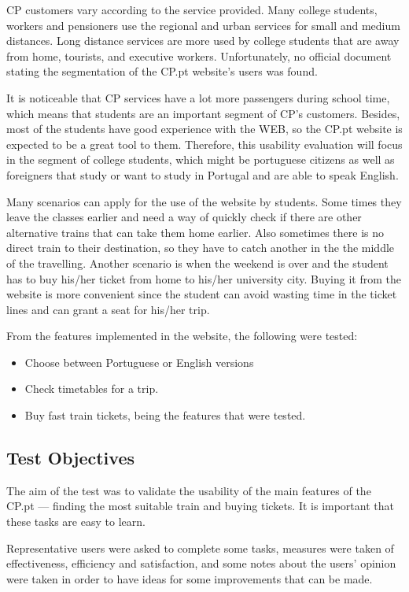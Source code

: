 \documentclass[a4paper]{article}
\begin{document}
CP customers vary according to the service provided. Many college students, workers and pensioners use the regional and urban services for small and medium distances. Long distance services are more used by college students that are away from home, tourists, and executive workers. Unfortunately, no official document stating the segmentation of the CP.pt website's users was found.

It is noticeable that CP services have a lot more passengers during school time, which means that students are an important segment of CP's customers. Besides, most of the students have good experience with the WEB, so the CP.pt website is expected to be a great tool to them. Therefore, this usability evaluation will focus in the segment of college students, which might be portuguese citizens as well as foreigners that study or want to study in Portugal and are able to speak English.

Many scenarios can apply for the use of the website by students. Some times they leave the classes earlier and need a way of quickly check if there are other alternative trains that can take them home earlier. Also sometimes there is no direct train to their destination, so they have to catch another in the the middle of the travelling. Another scenario is when the weekend is over and the student has to buy his/her ticket from home to his/her university city. Buying it from the website is more convenient since the student can avoid wasting time in the ticket lines and can grant a seat for his/her trip.

From the features implemented in the website, the following were tested:
\begin{itemize}
  \item Choose between Portuguese or English versions
  \item Check timetables for a trip.
  \item Buy fast train tickets, being the features that were tested.
\end{itemize}


\subsection{Test Objectives}

The aim of the test was to validate the usability of the main features of the CP.pt --- finding the most suitable train and buying tickets. It is important that these tasks are easy to learn.

Representative users were asked to complete some tasks, measures were taken of effectiveness, efficiency and satisfaction, and some notes about the users' opinion were taken in order to have ideas for some improvements that can be made.
\end{document}

